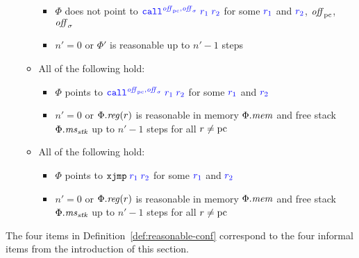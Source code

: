 \documentclass{jfp}
\newenvironment{jversion}{}{}
\begin{document}
\begin{jversion}
\begin{definition}
\begin{enumerate}
\begin{itemize}
\begin{itemize}
        \item $\Phi$ does not point to $\src{\scall{\offpc,\offsigma}{r_1}{r_2}}$ for some ${\color{blue} r_1}$ and ${\color{blue} r_2}$, $\mathit{off}_{\mathrm{pc}}$, $\mathit{off}_\sigma$
        \item $n' = 0$ or $\Phi'$ is reasonable up to $n'-1$ steps
        \end{itemize}
      \item All of the following hold:
        \begin{itemize}
        \item $\Phi$ points to $\src{\scall{\offpc,\offsigma}{r_1}{r_2}}$ for some ${\color{blue} r_1}$ and ${\color{blue} r_2}$
        \item $n' = 0$ or $\Phi.\reg(r)$ is reasonable in memory $\Phi.\mathit{mem}$ and free stack $\Phi.\mathit{ms}_{\mathit{stk}}$ up to $n'-1$ steps for all $r \neq \mathrm{pc}$
        \end{itemize}
      \item All of the following hold:
        \begin{itemize}
        \item $\Phi$ points to $\src{\txjmp{r_1}{r_2}}$ for some ${\color{blue} r_1}$ and ${\color{blue} r_2}$
        \item $n' = 0$ or $\Phi.\reg(r)$ is reasonable in memory $\Phi.\mathit{mem}$ and free stack $\Phi.\mathit{ms}_{\mathit{stk}}$ up to $n'-1$ steps for all $r \neq \mathrm{pc}$
        \end{itemize}
      \end{itemize}
    \end{enumerate}
  \end{definition}
The four items in Definition~\ref{def:reasonable-conf} correspond to the four informal items from the introduction of this section.


\end{jversion}
\end{document}
